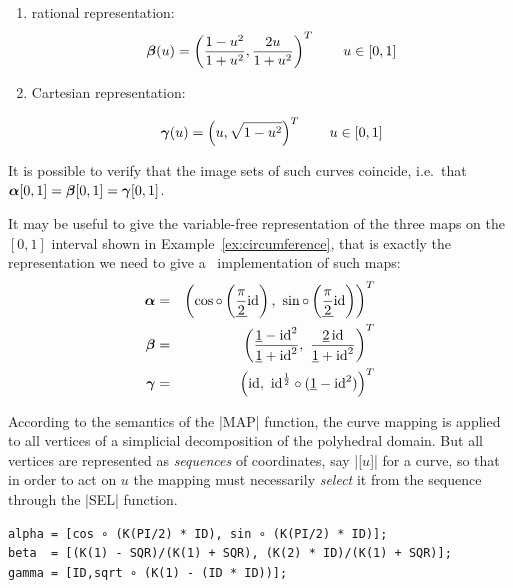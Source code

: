\begin{coding}[Algebraic computation of FE = $\delta_1$]
{\begin{condition}
\begin{enumerate}
\item  rational representation:
\[
{\mbox{\boldmath $\beta$}}(u) = \left({1-u^2 \over 1+u^2}, {2u \over 1+u^2}\right)^T
\qquad u\in[0,1]
\]


\item  Cartesian representation:

\[
{\mbox{\boldmath $\gamma$}}(u) = \left(u, \sqrt{1-u^2}\right)^T
\qquad u\in[0,1]
\]

\end{enumerate}

It is possible to verify that the image sets of such curves coincide, 
i.e.~that ${\mbox{\boldmath $\alpha$}}[0,1]={\mbox{\boldmath $\beta$}}[0,1]={\mbox{\boldmath $\gamma$}}[0,1]$.

\end{condition}


\begin{condition}
\label{ex:5:4:freearc}
  
It may be useful to give the variable-free representation of the three
maps on the $[0,1]$ interval shown in Example~\ref{ex:circumference},
that is exactly the representation we need to give a \pl\
implementation of such maps:
\begin{eqnarray}
{\mbox{\boldmath $\alpha$}} &=& \left(\cos \circ \left( \underline{\pi \over 2} 
\textrm{id}\right), \
\sin \circ \left( \underline{\pi \over 2} \textrm{id} \right) \right)^T
\\
{\mbox{\boldmath $\beta$}} &=& \left(\frac{\underline{1} - 
\textrm{id}^2 }{ \underline{1}+ \textrm{id}^2}, \
{\underline{2} \,\textrm{id} \over \underline{1}+ \textrm{id}^2} 
\right)^T
\\
{\mbox{\boldmath $\gamma$}} &=& \left( \textrm{id}, \ \textrm{id}^{1\over 2}\circ 
(\underline{1}- \textrm{id}^2) \right)^T
\label{eq:5:alpha}
\end{eqnarray}

According to the semantics of the |MAP| function, the curve
mapping is applied to all vertices of a simplicial decomposition of
the polyhedral domain.  But all vertices are represented as
\emph{sequences} of coordinates, say |[$u$]| for a curve, so
that in order to act on $u$ the mapping must necessarily \emph{select}
it from the sequence through the |SEL| function.

\begin{lstlisting}[language=JuliaLocal, style=julia, mathescape=true]
alpha = [cos ∘ (K(PI/2) * ID), sin ∘ (K(PI/2) * ID)];
beta  = [(K(1) - SQR)/(K(1) + SQR), (K(2) * ID)/(K(1) + SQR)]; 
gamma = [ID,sqrt ∘ (K(1) - (ID * ID))];


\end{lstlisting}
\end{condition}}
\end{coding}
